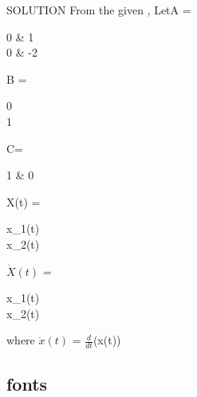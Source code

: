 \documentclass[15pt]{beamer}
\begin{document}
\def\beamer@mytheme@style{green}
\begin{frame}[fragile]{SOLUTION}
	From the given ,\newline 
	\newline Let\hspace{10pt}A = \begin{bmatrix}0 & 1\\0 & -2\end{bmatrix}\hspace{5pt}B = \begin{bmatrix}0\\1\end{bmatrix}\hspace{5pt}C=\begin{bmatrix}1 & 0 \end{bmatrix}
	\newline \newline \newline X(t) = \begin{bmatrix}x_{1}(t)\\x_{2}(t)\end{bmatrix}
	\newline \newline \newline $\dot X(t)$ = \begin{bmatrix}\dot x_{1}(t) \\ \dot x_{2}(t)\end{bmatrix}\hspace{15pt} where $\dot x(t)$ = $\frac{d}{dt}$(x(t))
	
	
	
\end{frame}

\subsection{fonts}
\end{document}
